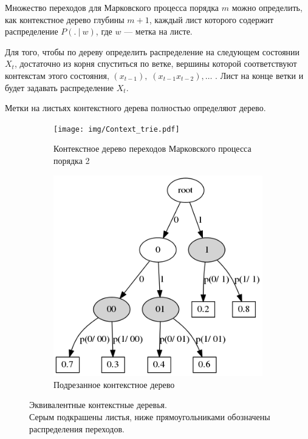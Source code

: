 \documentclass{matmex-diploma-custom}
\begin{document}
Множество переходов для Марковского процесса порядка $ m $ можно определить, как контекстное дерево глубины $ m+1 $, каждый лист которого содержит распределение $P(.~|~w)$, где $ w $ --- метка на листе.

Для того, чтобы по дереву определить распределение на следующем состоянии $ X_{t} $, достаточно из корня спуститься по ветке, вершины которой соответствуют контекстам этого состояния, $(x_{t-1}),\; (x_{t-1}x_{t-2}), \ldots$ . Лист на конце ветки и будет задавать распределение $ X_{t} $.

\begin{remark}
Метки на листьях контекстного дерева полностью определяют дерево.
\end{remark}

\begin{figure}[h!]\centering
\begin{subfigure}[b]{0.49 \textwidth}
	\texttt{[image: img/Context\_trie.pdf]}
	\centering
	\caption{ Контекстное дерево переходов Марковского процесса порядка 2 }
	\label{fig:context_trie}
\end{subfigure}
\hfil \hfil
\begin{subfigure}[b]{0.49 \textwidth}
	\includegraphics[scale=0.38]{img/Prune_c_trie.png}
	\centering
	\caption{ Подрезанное контекстное дерево}
	\label{fig:prune_c_trie}
\end{subfigure}
\caption{Эквивалентные контекстные деревья. \\Серым подкрашены листья, ниже прямоугольниками обозначены распределения переходов.}
\label{fig:sample_tries}
\end{figure}
\end{document}
